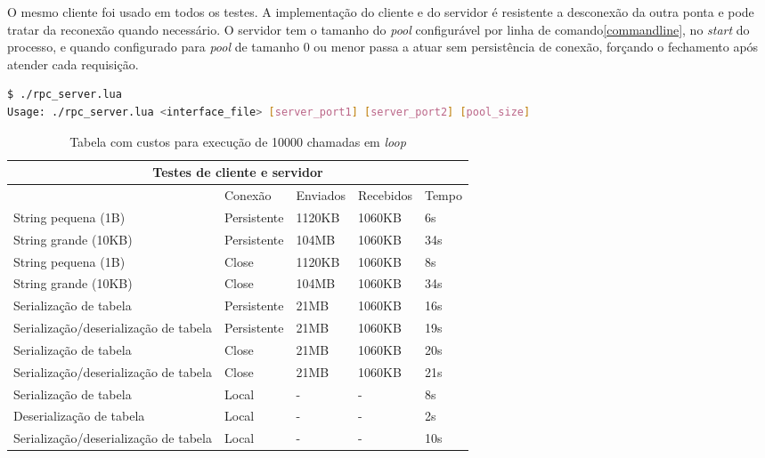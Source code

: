 \documentclass[11pt]{article}
\begin{document}
O mesmo cliente foi usado em todos os testes. A implementação do cliente e do
servidor é resistente a desconexão da outra ponta e pode tratar da reconexão
quando necessário. O servidor tem o tamanho do \textit{pool} configurável por
linha de comando\ref{commandline}, no \textit{start} do processo, e quando
configurado para \textit{pool} de tamanho 0 ou menor passa a atuar sem
persistência de conexão, forçando o fechamento após atender cada requisição.

\begin{lstlisting}[label={commandline},language=sh,caption=Linha de comando]
$ ./rpc_server.lua
Usage: ./rpc_server.lua <interface_file> [server_port1] [server_port2] [pool_size]
\end{lstlisting}

\renewcommand{\arraystretch}{2}
\begin{table}
\begin{center}
{\footnotesize \begin{tabular}{p{2.5cm} p{2.5cm} p{2.5cm} p{2.5cm} p{2.5cm}}
\hline
\multicolumn{5}{c}{Testes de cliente e servidor} \\ \hline
~ & Conexão & Enviados & Recebidos & Tempo \\ \hline
String pequena (1B) & Persistente & 1120KB & 1060KB & 6s \\
String grande (10KB) & Persistente & 104MB & 1060KB & 34s \\
String pequena (1B) & Close & 1120KB & 1060KB & 8s \\
String grande (10KB) & Close & 104MB & 1060KB & 34s \\
Serialização de tabela & Persistente & 21MB & 1060KB & 16s \\
Serialização/deserialização de tabela & Persistente & 21MB & 1060KB & 19s \\
Serialização de tabela & Close & 21MB & 1060KB & 20s \\
Serialização/deserialização de tabela & Close & 21MB & 1060KB & 21s \\
Serialização de tabela & Local & - & - & 8s \\
Deserialização de tabela & Local & - & - & 2s \\
Serialização/deserialização de tabela & Local & - & - & 10s \\
\hline
\end{tabular}}
\caption{Tabela com custos para execução de 10000 chamadas em \textit{loop}}
\label{tab:compare}
\end{center}
\end{table}
\end{document}
